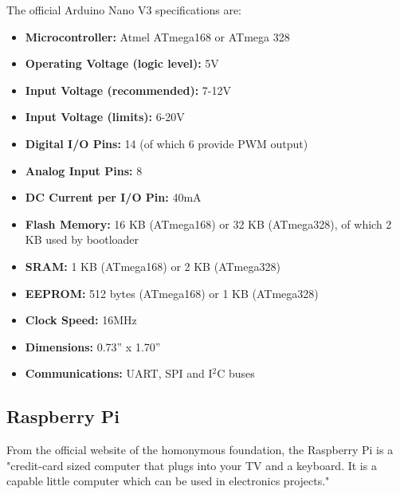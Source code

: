 	The official Arduino Nano V3 specifications are:
		\begin{itemize}
			\item \textbf{Microcontroller:} Atmel ATmega168 or ATmega 328
			\item \textbf{Operating Voltage (logic level):} 5V
			\item \textbf{Input Voltage (recommended):} 7-12V
			\item \textbf{Input Voltage (limits):} 6-20V
			\item \textbf{Digital I/O Pins:} 14 (of which 6 provide PWM output)
			\item \textbf{Analog Input Pins:} 8
			\item \textbf{DC Current per I/O Pin:} 40mA
			\item \textbf{Flash Memory:} 16 KB (ATmega168) or 32 KB (ATmega328), of which 2 KB used by bootloader
			\item \textbf{SRAM:} 1 KB (ATmega168) or 2 KB (ATmega328)
			\item \textbf{EEPROM:} 512 bytes (ATmega168) or 1 KB (ATmega328)
			\item \textbf{Clock Speed:} 16MHz
			\item \textbf{Dimensions:} 0.73'' x 1.70''
			\item \textbf{Communications:} UART, SPI and I$^2$C buses
		\end{itemize}













\newpage
\subsection{Raspberry Pi}

	From the official website of the homonymous foundation, the Raspberry Pi is a "credit-card sized computer that plugs into your TV and a keyboard. It is a capable little computer which can be used in electronics projects."\\

